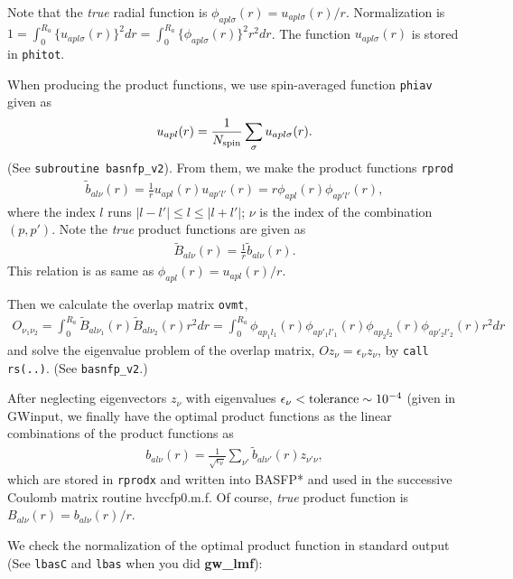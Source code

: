 \documentclass[a4paper,10pt,epsf,fleqn]{article}
\newcommand{\io}[1]{{\sf  #1}}
\begin{document}
Note that the \textit{true} radial function is
$\phi_{apl\sigma}(r) = u_{apl\sigma}(r)/r$.
Normalization is 
$1=\int_0^{R_a} \{ u_{apl\sigma}(r) \}^2 dr = 
   \int_0^{R_a} \{ \phi_{apl\sigma}(r) \}^2 r^2dr$.
The function $u_{apl\sigma}(r)$ is stored in \verb#phitot#.

When producing the product functions,
we use spin-averaged function \verb#phiav# given as
\begin{eqnarray}
   u_{apl}(r) = \frac{1}{N_{\rm spin}}\sum_{\sigma}
   u_{apl\sigma}(r).
\end{eqnarray}
(See \verb|subroutine basnfp_v2|).
From them, we make the product functions \verb#rprod#
\begin{eqnarray}
  \tilde{b}_{al\nu}(r) = \frac{1}{r}{u_{a p l }(r) u_{a p' l'}(r)}
  = r \phi_{a p l}(r) \phi_{a p' l'}(r),
\end{eqnarray}
where the index $l$ runs $|l-l'| \le l \le |l+l'|$;
$\nu$ is the index of the combination $(p,p')$.
Note the {\it true} product functions are given as
\begin{eqnarray}
  \tilde{B}_{al\nu}(r) = \frac{1}{r}\tilde{b}_{al\nu}(r).
\end{eqnarray}
This relation is as same as $\phi_{apl}(r)=u_{apl}(r)/r$.

Then we calculate the overlap matrix \verb#ovmt#,
\begin{eqnarray}
  O_{\nu_1\nu_2} = \int_0^{R_a} 
  \tilde{B}_{al\nu_1}(r) \tilde{B}_{al\nu_2}(r) r^2 dr
  = \int_0^{R_a}  \phi_{a p_1 l_1}(r) \phi_{a p'_1 l'_1}(r)
                  \phi_{a p_2 l_2}(r) \phi_{a p'_2 l'_2}(r) r^2 dr
\end{eqnarray}
and solve the eigenvalue problem of the overlap matrix,
$Oz_{\nu}=\epsilon_{\nu} z_{\nu}$, by \verb#call rs(..)#. 
(See \verb|basnfp_v2|.)

After neglecting eigenvectors
$z_{\nu}$ with eigenvalues $\epsilon_{\nu} < {\rm tolerance} \sim 10^{-4}$ (given in \io{GWinput}, 
we finally have the optimal product functions as the linear combinations 
of the product functions as
\begin{eqnarray}
   b_{al\nu}(r) = \frac{1}{\sqrt{\epsilon_{\nu}}}
   \sum_{\nu'}\tilde{b}_{al\nu'}(r)z_{\nu'\nu},
\end{eqnarray}
which are stored in \verb#rprodx# and written into {\sf BASFP*}
and used in the successive Coulomb matrix routine {\sf hvccfp0.m.f}.
Of course, \textit{true} product function is 
$B_{al\nu}(r) = b_{al\nu}(r)/r$.

We check the normalization of the optimal product function
in standard output 
(See \verb|lbasC| and \verb|lbas| when you did {\bf gw\_lmf}):
\end{document}

